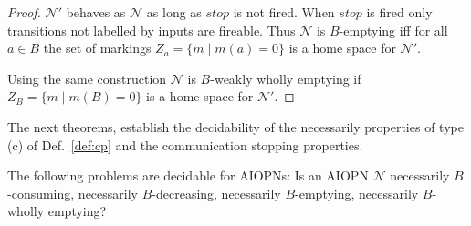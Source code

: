 \begin{proof}
$\mathcal N'$ behaves as $\mathcal N$ as long as $stop$ is not fired.
When $stop$ is fired only transitions not labelled by inputs are fireable.
Thus $\mathcal N$ is $B$-emptying iff for all $a\in B$
the set of markings $Z_a=\{m \mid m(a)=0\}$ is a home space for $\mathcal N'$.

\smallskip{}
Using the same construction $\mathcal N$ is $B$-weakly wholly emptying
if $Z_B=\{m \mid m(B)=0\}$ is a home space for $\mathcal N'$.
\end{proof}

\smallskip
The next theorems, 
establish the decidability of the necessarily properties
of type (c) of Def.~\ref{def:cp} and the communication stopping properties. 

\begin{theorem}
\label{thm:nec-dec}
The following problems are decidable for AIOPNs: Is an AIOPN $\mathcal N$  necessarily $B$-consuming,
necessarily $B$-decreasing,  necessarily $B$-emptying,  necessarily $B$-wholly emptying?
\end{theorem}
